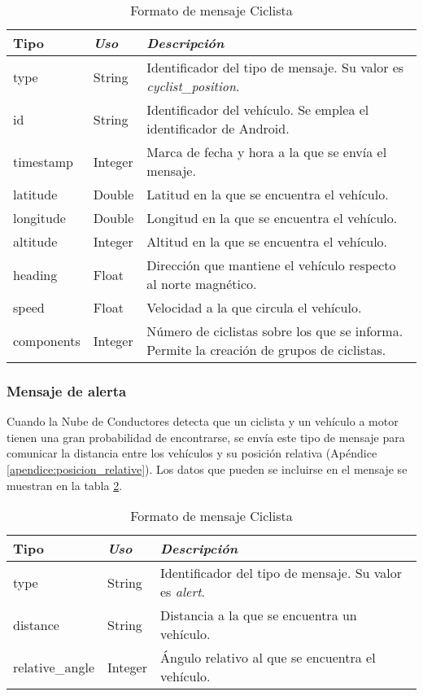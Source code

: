 \begin{table}[h]
	\centering
	\caption{Formato de mensaje Ciclista}\label{tab:CamposMensajePosCiclistaNubeConductores}
	\begin{tabular}{lll}
		\toprule
			\textbf{Tipo} & \emph{Uso} & \emph{Descripción}\\
		\midrule
			type			&	String	&	Identificador del tipo de mensaje. Su valor es
														\emph{cyclist\_position}.	\\
			id				&	String	&	Identificador del vehículo. Se emplea el
														identificador de Android.		\\
			timestamp	&	Integer	&	Marca de fecha y hora a la que se envía el mensaje.	\\
			latitude	&	Double	&	Latitud en la que se encuentra el vehículo.	\\
			longitude	&	Double	&	Longitud en la que se encuentra el vehículo.\\
			altitude	&	Integer	&	Altitud en la que se encuentra el vehículo.	\\
			heading		&	Float		&	Dirección que mantiene el vehículo respecto al
														norte magnético.		\\
			speed			&	Float		&	Velocidad a la que circula el vehículo.	\\
			components 	&	Integer	&	Número de ciclistas sobre los que se informa.
															Permite la creación de grupos de ciclistas. \\
		\bottomrule
	\end{tabular}
\end{table}
\FloatBarrier
\subsubsection{Mensaje de alerta}\label{sssection:MensajeAlerta}
Cuando la Nube de Conductores detecta que un ciclista y un vehículo a
motor tienen una gran probabilidad de encontrarse, se envía este tipo de
mensaje para comunicar la distancia entre los vehículos y su posición relativa
(Apéndice \ref{apendice:posicion_relative}). Los datos que pueden se incluirse
en el mensaje se muestran en la tabla
\ref{tab:CamposMensajePosCiclistaNubeConductores}.

\begin{table}[h]
	\centering
	\caption{Formato de mensaje Ciclista}
	\label{tab:CamposMensajePosCiclistaNubeConductores}
	\begin{tabular}{lll}
		\toprule
			\textbf{Tipo} & \emph{Uso} & \emph{Descripción}\\
		\midrule
			type						&	String	&	Identificador del tipo de mensaje. Su valor es
														\emph{alert}.	\\
			distance				&	String	&	Distancia a la que se encuentra un vehículo.\\
			relative\_angle	&	Integer	&	Ángulo relativo al que se encuentra
											el vehículo.\\
		\bottomrule
	\end{tabular}
\end{table}